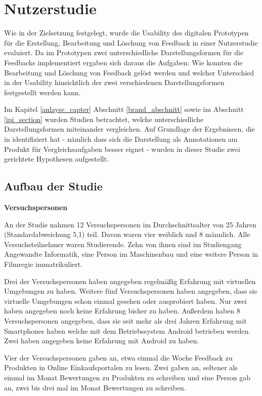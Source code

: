 \chapter{Nutzerstudie}\label{study}

Wie in der Zielsetzung festgelegt, wurde die Usability des digitalen Prototypen für die Erstellung, Bearbeitung und Löschung von Feedback 
in einer Nutzerstudie evaluiert. Da im Prototypen zwei unterschiedliche Darstellungsformen für die Feedbacks implementiert ergaben sich daraus die Aufgaben: Wie konnten die Bearbeitung und Löschung von Feedback gelöst werden und welcher Unterschied in der Usability hinsichtlich der zwei verschiedenen Darstellungsformen festgestellt werden kann.

Im Kapitel \ref{anlayse_capter} Abschnitt \ref{brand_abschnitt} sowie im Abschnitt \ref{ipi_section} wurden Studien betrachtet, welche unterschiedliche Darstellungsformen 
miteinander vergleichen. Auf Grundlage der Ergebnissen, die \citeauthor{Brandenburg2019} in \cite{Brandenburg2019} identifiziert hat - nämlich dass sich die Darstellung als Annotationen am Produkt für Vergleichsaufgaben besser eignet - wurden in dieser Studie zwei gerichtete Hypothesen aufgestellt. 
 
\section{Aufbau der Studie}

\textbf{Versuchspersonen}

An der Studie nahmen 12 Versuchspersonen im Durchschnittsalter von 25 Jahren (Standardabweichung 5,1) teil.  Davon waren vier weiblich und 8 männlich. 
Alle Versuchsteilnehmer waren Studierende. Zehn von ihnen sind im Studiengang Angewandte Informatik, eine Person im Maschinenbau und eine weitere Person in Filmregie immatrikuliert.

Drei der Versuchspersonen haben angegeben regelmäßig Erfahrung mit virtuellen Umgebungen zu haben. Weitere fünf Versuchspersonen haben angegeben, dass sie virtuelle Umgebungen schon 
einmal gesehen oder ausprobiert haben. Nur zwei haben angegeben noch keine Erfahrung bisher zu haben. 
Außerdem haben 8 Versuchspersonen angegeben, dass sie seit mehr als drei Jahren Erfahrung mit Smartphones haben welche mit dem Betriebssystem Android betrieben werden. Zwei haben angegeben keine 
Erfahrung mit Android zu haben. 

Vier der Versuchspersonen gaben an, etwa einmal die Woche Feedback zu Produkten in Online Einkaufsportalen zu lesen. Zwei gaben an, seltener als einmal im Monat Bewertungen zu Produkten zu schreiben und eine Person gab
an, zwei bis drei mal im Monat Bewertungen zu schreiben. 

